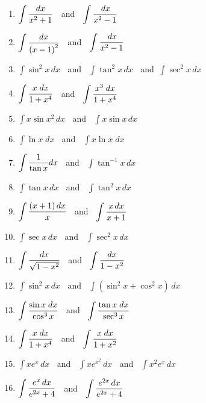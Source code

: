 \begin{enumerate}
\item  $\displaystyle  \int {{{dx} \over {x^2  + 1}}}  $ $\ $ and $\ $ $\displaystyle  \int {{{\,dx} \over {x^2  - 1}}}  $

\item  $\displaystyle  \int {{{dx} \over {\left( {x - 1} \right)^2 }}}  $ $\ $ and $\ $ $\displaystyle  \int {{{\,dx} \over {x^2  - 1}}}  $

\item  $\displaystyle  \int {\sin ^2 x\,dx}  $  $\ $ and $\ $ $\displaystyle  \int {\tan ^2 x\,dx}  $  $\ $ and $\ $$\displaystyle  \int {\sec ^2 x\,dx}  $

\item $\displaystyle  \int {{{x\;dx} \over {1 + x^4 }}}  $ $\ $ and $\ $ $\displaystyle  \int {{{x^3 \;dx} \over {1 + x^4 }}}  $

\item  $\displaystyle  \int {x\sin x^2 \,dx}  $ $\ $ and $\ $ $\displaystyle  \int {x\sin x\,dx}  $

\item  $\displaystyle  \int {\ln x\;dx}  $ $\ $ and $\ $ $\displaystyle  \int {x\ln x\;dx}  $

\item $\displaystyle  \int {{1 \over {\tan x}}dx}  $ $\ $ and $\ $ $\displaystyle  \int {\tan ^{ - 1} x\,dx}  $

\item  $\displaystyle  \int {\tan x\,dx}  $ $\ $ and $\ $ $\displaystyle  \int {\tan ^2 x\,dx}  $

\item $\displaystyle  \int {{{\left( {x + 1} \right)dx} \over x}}  $ $\ $ and $\ $ $\displaystyle  \int {{{x\,dx} \over {x + 1}}}  $

\item $\displaystyle  \int {\sec x\,dx}  $ $\ $ and $\ $ $\displaystyle  \int {\sec ^2 x\,dx}  $

\item    $\displaystyle  \int {{{dx} \over {\sqrt {1 - x^2 } }}}  $ $\ $ and $\ $ $\displaystyle  \int {{{dx} \over {1 - x^2 }}}  $

\item  $\displaystyle  \int {\sin ^2 x\,dx}  $ $\ $ and $\ $ $\displaystyle  \int {\left( {\sin ^2 x + \cos ^2 x} \right)\,dx}  $

\item $\displaystyle  \int {{{\sin x\;dx} \over {\cos ^3 x}}}  $ $\ $ and $\ $ $\displaystyle  \int {{{\tan x\;dx} \over {\sec ^3 x}}}  $

\item $\displaystyle  \int {{{x\;dx} \over {1 + x^4 }}}  $ $\ $ and $\ $ $\displaystyle  \int {{{x\;dx} \over {1 + x^2 }}}  $

\item $\int {xe^x \,dx} $ $\ $ and $\ $ $\int {xe^{x^2 } \,dx} $  $\ $ and $\ $ $\int {x^2 e^x \,dx} $

\item $\displaystyle \int {{{e^x \,dx} \over {e^{2x}  + 4}}} $  $\ $ and $\ $ $\displaystyle \int {{{e^{2x} \,dx} \over {e^{2x}  + 4}}} $
\end{enumerate}



